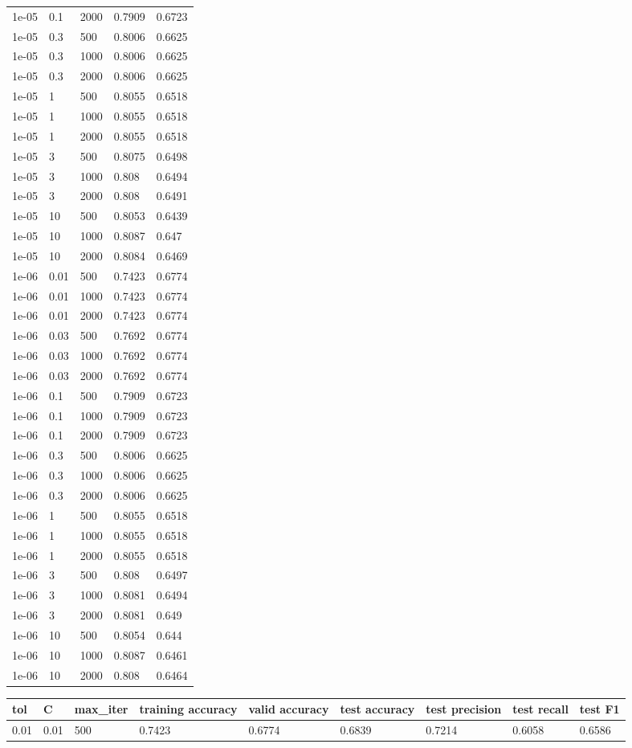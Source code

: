 \documentclass{article}%
\begin{document}
\begin{longtable}{l l l l l}
1e{-}05&0.1&2000&0.7909&0.6723\\%
1e{-}05&0.3&500&0.8006&0.6625\\%
1e{-}05&0.3&1000&0.8006&0.6625\\%
1e{-}05&0.3&2000&0.8006&0.6625\\%
1e{-}05&1&500&0.8055&0.6518\\%
1e{-}05&1&1000&0.8055&0.6518\\%
1e{-}05&1&2000&0.8055&0.6518\\%
1e{-}05&3&500&0.8075&0.6498\\%
1e{-}05&3&1000&0.808&0.6494\\%
1e{-}05&3&2000&0.808&0.6491\\%
1e{-}05&10&500&0.8053&0.6439\\%
1e{-}05&10&1000&0.8087&0.647\\%
1e{-}05&10&2000&0.8084&0.6469\\%
1e{-}06&0.01&500&0.7423&0.6774\\%
1e{-}06&0.01&1000&0.7423&0.6774\\%
1e{-}06&0.01&2000&0.7423&0.6774\\%
1e{-}06&0.03&500&0.7692&0.6774\\%
1e{-}06&0.03&1000&0.7692&0.6774\\%
1e{-}06&0.03&2000&0.7692&0.6774\\%
1e{-}06&0.1&500&0.7909&0.6723\\%
1e{-}06&0.1&1000&0.7909&0.6723\\%
1e{-}06&0.1&2000&0.7909&0.6723\\%
1e{-}06&0.3&500&0.8006&0.6625\\%
1e{-}06&0.3&1000&0.8006&0.6625\\%
1e{-}06&0.3&2000&0.8006&0.6625\\%
1e{-}06&1&500&0.8055&0.6518\\%
1e{-}06&1&1000&0.8055&0.6518\\%
1e{-}06&1&2000&0.8055&0.6518\\%
1e{-}06&3&500&0.808&0.6497\\%
1e{-}06&3&1000&0.8081&0.6494\\%
1e{-}06&3&2000&0.8081&0.649\\%
1e{-}06&10&500&0.8054&0.644\\%
1e{-}06&10&1000&0.8087&0.6461\\%
1e{-}06&10&2000&0.808&0.6464\\%
\hline%
\end{longtable}%
\begin{longtable}{l l l l l l l l l}%
\hline%
tol&C&max\_iter&training accuracy&valid accuracy&test accuracy&test precision&test recall&test F1\\%
\hline%
\endhead%
\hline%
0.01&0.01&500&0.7423&0.6774&0.6839&0.7214&0.6058&0.6586\\%
\hline%
\end{longtable}%
\end{document}
